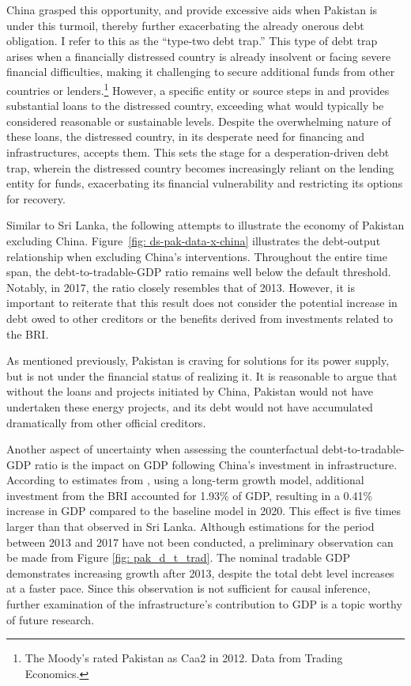 China grasped this opportunity, and provide excessive aids when Pakistan is under this turmoil, thereby further exacerbating the already onerous debt obligation. I refer to this as the ``type-two debt trap.''
This type of debt trap arises when a financially distressed country is already insolvent or facing severe financial difficulties, making it challenging to secure additional funds from other countries or lenders.\footnote{
    The Moody's rated Pakistan as Caa2 in 2012. Data from Trading Economics.
}
However, a specific entity or source steps in and provides substantial loans to the distressed country, exceeding what would typically be considered reasonable or sustainable levels. Despite the overwhelming nature of these loans, the distressed country, in its desperate need for financing and infrastructures, accepts them. This sets the stage for a desperation-driven debt trap, wherein the distressed country becomes increasingly reliant on the lending entity for funds, exacerbating its financial vulnerability and restricting its options for recovery.

Similar to Sri Lanka, the following attempts to illustrate the economy of Pakistan excluding China. Figure~\ref{fig: ds-pak-data-x-china} illustrates the debt-output relationship when excluding China's interventions. Throughout the entire time span, the debt-to-tradable-GDP ratio remains well below the default threshold. Notably, in 2017, the ratio closely resembles that of 2013. However, it is important to reiterate that this result does not consider the potential increase in debt owed to other creditors or the benefits derived from investments related to the BRI.

As mentioned previously, Pakistan is craving for solutions for its power supply, but is not under the financial status of realizing it. It is reasonable to argue that without the loans and projects initiated by China, Pakistan would not have undertaken these energy projects, and its debt would not have accumulated dramatically from other official creditors.

Another aspect of uncertainty when assessing the counterfactual debt-to-tradable-GDP ratio is the impact on GDP following China's investment in infrastructure. According to estimates from \citet*{Bandiera-Vasileios-BRI-debt}, using a long-term growth model, additional investment from the BRI accounted for 1.93\% of GDP, resulting in a 0.41\% increase in GDP compared to the baseline model in 2020. This effect is five times larger than that observed in Sri Lanka. Although estimations for the period between 2013 and 2017 have not been conducted, a preliminary observation can be made from Figure \ref{fig: pak_d_t_trad}. The nominal tradable GDP demonstrates increasing growth after 2013, despite the total debt level increases at a faster pace. Since this observation is not sufficient for causal inference, further examination of the infrastructure's contribution to GDP is a topic worthy of future research.